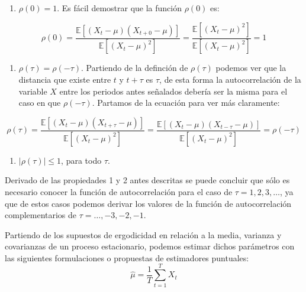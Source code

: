 \documentclass[
]{book}
\providecommand{\tightlist}{%
  \setlength{\itemsep}{0pt}\setlength{\parskip}{0pt}}
\begin{document}
\begin{enumerate}
\def\labelenumi{\arabic{enumi}.}
\tightlist
\item
  \(\rho(0) = 1\). Es fácil demostrar que la función \(\rho(0)\) es:
\end{enumerate}

\begin{equation}
    \rho(0) = \frac{\mathbb{E}[(X_t - \mu)(X_{t + 0} - \mu)]}{\mathbb{E}[(X_t - \mu)^2]} = \frac{\mathbb{E}[(X_t - \mu)^2]}{\mathbb{E}[(X_t - \mu)^2]} = 1
\end{equation}

\begin{enumerate}
\def\labelenumi{\arabic{enumi}.}
\setcounter{enumi}{1}
\tightlist
\item
  \(\rho(\tau) = \rho(-\tau)\). Partiendo de la definción de \(\rho(\tau)\) podemos ver que la distancia que existe entre \(t\) y \(t + \tau\) es \(\tau\), de esta forma la autocorrelación de la variable \(X\) entre los periodos antes señalados debería ser la misma para el caso en que \(\rho(-\tau)\). Partamos de la ecuación para ver más claramente:
\end{enumerate}

\begin{equation}
    \rho(\tau) = \frac{\mathbb{E}[(X_t - \mu)(X_{t + \tau} - \mu)]}{\mathbb{E}[(X_t - \mu)^2]} = \frac{\mathbb{E}[(X_t - \mu)(X_{t - \tau} - \mu)]}{\mathbb{E}[(X_t - \mu)^2]} = \rho(-\tau)
\end{equation}

\begin{enumerate}
\def\labelenumi{\arabic{enumi}.}
\setcounter{enumi}{2}
\tightlist
\item
  \(\lvert\rho(\tau)\lvert \leq 1\), para todo \(\tau\).
\end{enumerate}

Derivado de las propiedades 1 y 2 antes descritas se puede concluir que sólo es necesario conocer la función de autocorrelación para el caso de \(\tau = 1, 2, 3, \ldots\), ya que de estos casos podemos derivar los valores de la función de autocorrelación complementarios de \(\tau = \ldots, -3, -2, -1\).

Partiendo de los supuestos de ergodicidad en relación a la media, varianza y covarianzas de un proceso estacionario, podemos estimar dichos parámetros con las siguientes formulaciones o propuestas de estimadores puntuales:
\begin{equation}
    \hat{\mu} = \frac{1}{T} \sum^T_{t=1} X_t
    \label{eq:em6}
\end{equation}
\end{document}
